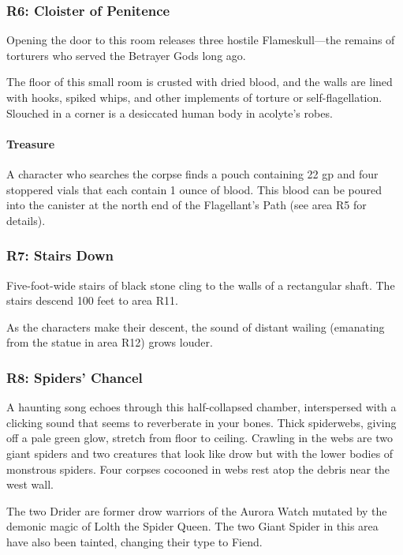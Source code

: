 \documentclass[10pt,a4paper,twoside,twocolumn,openany,nodeprecatedcode]{dndbook}
\begin{document}
\subsubsection{R6: Cloister of Penitence}
Opening the door to this room releases three hostile Flameskull—the remains of torturers who served the Betrayer Gods long ago.

\begin{DndReadAloud}{}
The floor of this small room is crusted with dried blood, and the walls are lined with hooks, spiked whips, and other implements of torture or self-flagellation. Slouched in a corner is a desiccated human body in acolyte's robes.

\end{DndReadAloud}

\paragraph{Treasure}
A character who searches the corpse finds a pouch containing 22 gp and four stoppered vials that each contain 1 ounce of blood. This blood can be poured into the canister at the north end of the Flagellant's Path (see area R5 for details).

\subsubsection{R7: Stairs Down}
Five-foot-wide stairs of black stone cling to the walls of a rectangular shaft. The stairs descend 100 feet to area R11.

As the characters make their descent, the sound of distant wailing (emanating from the statue in area R12) grows louder.

\subsubsection{R8: Spiders' Chancel}
\begin{DndReadAloud}{}
A haunting song echoes through this half-collapsed chamber, interspersed with a clicking sound that seems to reverberate in your bones. Thick spiderwebs, giving off a pale green glow, stretch from floor to ceiling. Crawling in the webs are two giant spiders and two creatures that look like drow but with the lower bodies of monstrous spiders. Four corpses cocooned in webs rest atop the debris near the west wall.

\end{DndReadAloud}

The two Drider are former drow warriors of the Aurora Watch mutated by the demonic magic of Lolth the Spider Queen. The two Giant Spider in this area have also been tainted, changing their type to Fiend.
\end{document}
